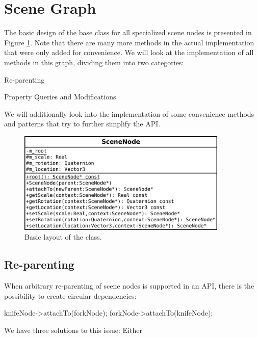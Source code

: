\section{Scene Graph}
\label{chapter:implementation:scenegraph}

	The basic design of the base class for all specialized scene nodes is presented in Figure \ref{fig:SceneNode1}. Note that there are many more methods in the actual implementation that were only added for convenience. We will look at the implementation of all methods in this graph, dividing them into two categories:

	\begin{smalllist}
		\item Re-parenting
		\item Property Queries and Modifications
	\end{smalllist}

	We will additionally look into the implementation of some convenience methods and patterns that try to further simplify the API.

	\begin{figure}[htbp]
		\centering
		\includegraphics[width=10cm]{images/SceneNode1.png}
		\caption{Basic layout of the  class.}
		\label{fig:SceneNode1}
	\end{figure}

	\subsection{Re-parenting}

		When arbitrary re-parenting of scene nodes is supported in an API, there is the possibility to create circular dependencies:

		\begin{code}[2]
			knifeNode->attachTo(forkNode);
			forkNode->attachTo(knifeNode);
		\end{code}

		We have three solutions to this issue: Either

